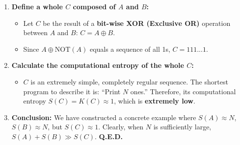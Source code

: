 \documentclass[11pt, a4paper]{article}
\begin{document}
\begin{itemize}
\begin{enumerate}
        \item \textbf{Define a whole $C$ composed of $A$ and $B$:}
            \begin{itemize}
                \item Let $C$ be the result of a \textbf{bit-wise XOR (Exclusive OR)} operation between $A$ and $B$: $C = A \oplus B$.
                \item Since $A \oplus \text{NOT}(A)$ equals a sequence of all 1s, $C = 111...1$.
            \end{itemize}
        \item \textbf{Calculate the computational entropy of the whole $C$:}
            \begin{itemize}
                \item $C$ is an extremely simple, completely regular sequence. The shortest program to describe it is: ``Print $N$ ones.'' Therefore, its computational entropy $S(C) = K(C) \approx 1$, which is \textbf{extremely low}.
            \end{itemize}
        \item \textbf{Conclusion:} We have constructed a concrete example where $S(A) \approx N$, $S(B) \approx N$, but $S(C) \approx 1$. Clearly, when $N$ is sufficiently large, $S(A) + S(B) \gg S(C)$.
            \textbf{Q.E.D.}
    \end{enumerate}
\end{itemize}
\end{document}
